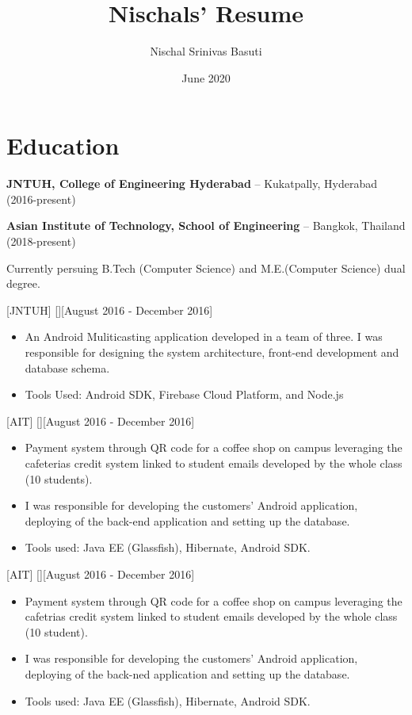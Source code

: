 \documentclass{article}
\title{Nischals' Resume}
\author{Nischal Srinivas Basuti}
\date{June 2020}
\begin{document}

\makecvtitle %

\section{Education}
\textbf{JNTUH, College of Engineering Hyderabad} -- Kukatpally, Hyderabad (2016-present)

\textbf{Asian Institute of Technology, School of Engineering} -- Bangkok, Thailand (2018-present)

Currently persuing B.Tech (Computer Science) and M.E.(Computer Science) dual degree. 

[JNTUH]
[][August 2016 - December 2016]

\begin{itemize}
    \item An Android Muliticasting application developed in a team of three. I was responsible for designing the system architecture, front-end development and database schema.
    \item Tools Used: Android SDK, Firebase Cloud Platform, and Node.js
\end{itemize}
 
[AIT]
[][August 2016 - December 2016]
\begin{itemize}
    \item  Payment system through QR code for a coffee shop on campus leveraging the cafeterias credit system linked to
    student emails developed by the whole class (10 students).
    \item I was responsible for developing the customers' Android application, deploying of the back-end application and
    setting up the database.
    \item Tools used: Java EE (Glassfish), Hibernate, Android SDK.
\end{itemize}

[AIT]
[][August 2016 - December 2016]
\begin{itemize}
    \item Payment system through QR code for a coffee shop on campus leveraging the cafetrias credit system linked to student emails developed by the whole class (10 student).
    \item I was responsible for developing the customers' Android application, deploying of the back-ned application and setting up the database.
    \item Tools used: Java EE (Glassfish), Hibernate, Android SDK.
\end{itemize}
\end{document}
